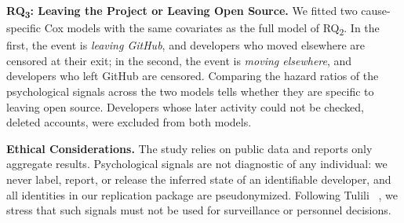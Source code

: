 \textbf{RQ\textsubscript{3}: Leaving the Project or Leaving Open Source.} We fitted two cause-specific Cox models with the same covariates as the full model of RQ\textsubscript{2}. In the first, the event is \textit{leaving GitHub}, and developers who moved elsewhere are censored at their exit; in the second, the event is \textit{moving elsewhere}, and developers who left GitHub are censored. Comparing the hazard ratios of the psychological signals across the two models tells whether they are specific to leaving open source. Developers whose later activity could not be checked, \eg deleted accounts, were excluded from both models.

\textbf{Ethical Considerations.} The study relies on public data and reports only aggregate results. Psychological signals are not diagnostic of any individual: we never label, report, or release the inferred state of an identifiable developer, and all identities in our replication package are pseudonymized. Following Tulili \etal~\cite{tulili2023burnout}, we stress that such signals must not be used for surveillance or personnel decisions.
